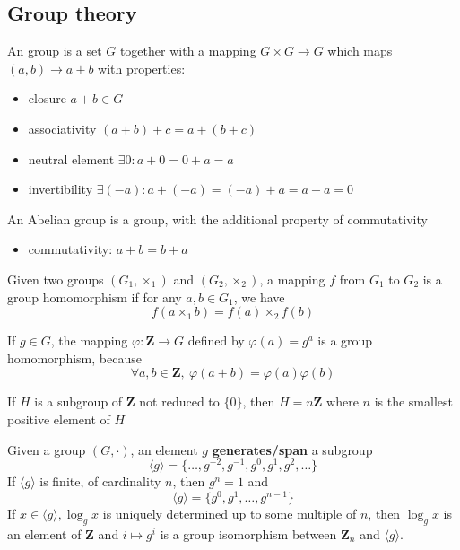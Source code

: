 \documentclass[11pt,a4paper]{article}
\newcommand{\bz}{\ensuremath{\mathbf{Z}}}
\begin{document}
\subsection{Group theory}
\begin{definition}[Group]
    \label{def:group}
    An group is a set $G$ together with a mapping $G \times G \to G$ which maps $(a,b) \to a+b$ with properties:
    \begin{itemize}
        \item closure $a+b \in G$
        \item associativity $(a+b)+c = a+(b+c)$
        \item neutral element $\exists 0 : a+0 = 0+a = a$
        \item invertibility $\exists (-a) : a+(-a) = (-a)+a = a - a = 0$
    \end{itemize}
\end{definition}
\begin{definition}
    \label{def:abel_group}
    An Abelian group is a group, with the additional property of commutativity
    \begin{itemize}
        \item commutativity: $a+b = b+a$
    \end{itemize}
\end{definition}
\begin{definition}
    Given two groups $(G_1, \times_1)$ and $(G_2, \times_2)$, a mapping $f$ from $G_1$ to $G_2$ is a group homomorphism if for any $a,b \in G_1$, we have
    \begin{equation}
        f(a \times_1 b) = f(a) \times_2 f(b)
    \end{equation}
\end{definition}
\begin{example}
    If $g \in G$, the mapping $\varphi: \bz \to G$ defined by $\varphi(a) = g^a$ is a group homomorphism, because
    \[\forall a,b \in \bz,\ \varphi(a+b) = \varphi(a)\varphi(b)\]
\end{example}
\begin{theorem}[Subgroups]
    If $H$ is a subgroup of $\bz$ not reduced to $\{0\}$, then $H = n\bz$ where $n$ is the smallest positive element of $H$
\end{theorem}
\begin{definition}[Generators]
    Given a group $(G,\cdot)$, an element $g$ \textbf{generates/span} a subgroup
    \[\langle g \rangle = \{\ldots, g^{-2}, g^{-1}, g^0, g^1, g^2, \ldots\}\]
    If $\langle g \rangle$ is finite, of cardinality $n$, then $g^n = 1$ and
    \[\langle g \rangle = \{g^0,g^1,\ldots,g^{n-1}\}\]
    If $x \in \langle g \rangle,\log_g x$ is uniquely determined up to some multiple of $n$, then $\log_g x$ is an element of $\bz$ and $i \mapsto g^i$ is a group isomorphism between $\bz_n$ and $\langle g \rangle$.
\end{definition}
\end{document}
